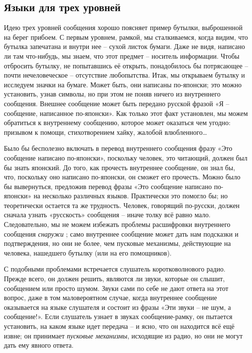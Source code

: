 \documentclass[../main.tex]{subfiles}
\begin{document}
\subsection{Языки для трех уровней}

Идею трех уровней сообщения хорошо поясняет пример бутылки, выброшенной на берег прибоем. С первым уровнем, рамкой, мы сталкиваемся, когда видим, что бутылка запечатана и внутри нее \--- сухой листок бумаги. Даже не видя, написано ли там что-нибудь, мы знаем, что этот предмет \--- носитель информации. Чтобы отбросить бутылку, не попытавшись её открыть, понадобилось бы потрясающее \--- почти нечеловеческое \--- отсутствие любопытства. Итак, мы открываем бутылку и исследуем значки на бумаге. Может быть, они написаны по-японски; это можно установить, узнав символы, но при этом не поняв ничего из внутреннего сообщения. Внешнее сообщение может быть передано русской фразой «Я \--- сообщение, написанное по-японски». Как только этот факт установлен, мы можем обратиться к внутреннему сообщению, которое может оказаться чем угодно: призывом к помощи, стихотворением хайку, жалобой влюбленного\ldots{}

Было бы бесполезно включать в перевод внутреннего сообщения фразу «Это сообщение написано по-японски», поскольку человек, это читающий, должен был бы знать японский. До того, как прочесть внутреннее сообщение, он знал бы, что, поскольку оно написано по-японски, он сможет его прочесть. Можно было бы вывернуться, предложив перевод фразы «Это сообщение написано по-японски» на несколько различных языков. Практически это помогло бы; но теоретически остается та же трудность. Человек, говорящий по-русски, должен сначала узнать «русскость» сообщения \--- иначе толку всё равно мало. Следовательно, мы не можем избежать проблемы расшифровки внутреннего сообщения \emph{снаружи} ; само внутреннее сообщение может дать нам подсказки и подтверждения, но они не более, чем пусковые механизмы, действующие на человека, нашедшего бутылку (или на его помощников).

С подобными проблемами встречается слушатель коротковолнового радио. Прежде всего, он должен решить, являются ли звуки, которые он слышит, сообщением или просто шумом. Звуки сами по себе не дают ответа на этот вопрос, даже в том маловероятном случае, когда внутреннее сообщение оказывается на языке слушателя и состоит из фразы «Эти звуки \--- не шум, а сообщение!». Если слушатель узнает в звуках сообщение-рамку, он пытается установить, на каком языке идет передача \--- и ясно, что он находится всё ещё извне; он принимает \emph{пусковые механизмы}, исходящие из радио, но они не могут дать ему явного ответа.
\end{document}
